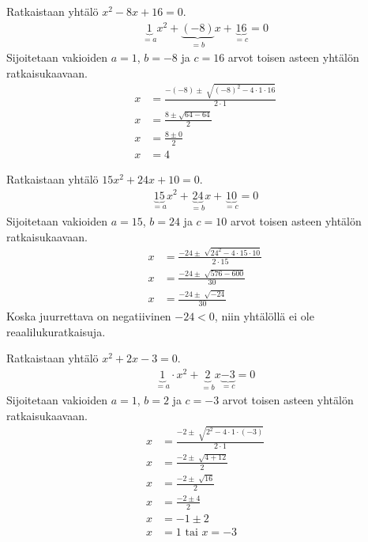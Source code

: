 \begin{esimerkki}
Ratkaistaan yhtälö $x^2-8x+16=0$.
\begin{align*}
\underbrace{1}_{=a}x^2 +\underbrace{(-8)}_{=b}x+\underbrace{16}_{=c}=0
\end{align*}
Sijoitetaan vakioiden $a=1$, $b=-8$ ja $c=16$ arvot toisen asteen yhtälön ratkaisukaavaan.
\begin{align*}
x&=\frac{-(-8)\pm \sqrt[]{(-8)^2-4\cdot 1 \cdot 16}}{2 \cdot 1} \\
x&=\frac{8 \pm \sqrt{64- 64}}{2} \\
x&=\frac{8 \pm 0}{2} \\
x&=4
\end{align*}
\end{esimerkki}

\begin{esimerkki}
Ratkaistaan yhtälö $15x^2+24x+10=0$.
\begin{align*}
\underbrace{15}_{=a}x^2+\underbrace{24}_{=b}x+\underbrace{10}_{=c}=0
\end{align*}
Sijoitetaan vakioiden $a=15$, $b=24$ ja $c=10$ arvot toisen asteen yhtälön ratkaisukaavaan.
\begin{align*}
x&=\frac{-24 \pm \sqrt[]{24^2-4 \cdot 15 \cdot 10}}{2 \cdot 15} \\
x&=\frac{-24 \pm \sqrt[]{576-600}}{30} \\
x&=\frac{-24 \pm \sqrt[]{-24}}{30}
\end{align*}
Koska juurrettava on negatiivinen $-24<0$, niin yhtälöllä ei ole reaalilukuratkaisuja. \\
\end{esimerkki}

\begin{esimerkki}
Ratkaistaan yhtälö $x^2+2x-3=0$.
\begin{align*}
\underbrace{1}_{=a} \cdot x^2+\underbrace{2}_{=b}x\underbrace{-3}_{=c}=0
\end{align*}
Sijoitetaan vakioiden $a=1$, $b=2$ ja $c=-3$ arvot toisen asteen yhtälön ratkaisukaavaan.
\begin{align*}
x&=\frac{-2 \pm \sqrt[]{2^2-4 \cdot 1 \cdot (-3)}}{2 \cdot 1} \\
x&=\frac{-2 \pm \sqrt[]{4+12}}{2} \\
x&=\frac{-2 \pm \sqrt[]{16}}{2} \\
x&=\frac{-2 \pm 4}{2} \\
x&=-1 \pm 2 \\
x&=1 \text{ tai } x=-3 \\
\end{align*}
\end{esimerkki}

